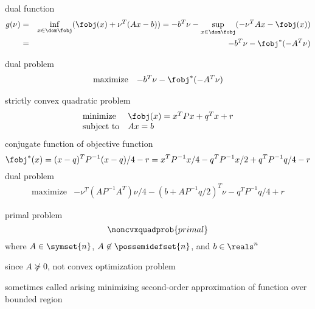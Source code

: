 \documentclass[17pt,landscape]{foils}
\begin{document}
{\vitem
	dual function
	\begin{eqnarray*}
			g(\nu)
			&
			=
			&
			\inf_{x\in\dom \fobj} (\fobj(x) + \nu^T(Ax-b))
			=
			-b^T\nu
			- \sup_{x\in\dom \fobj}(-\nu^TAx -\fobj(x))
		\\
		&
		=
		&
			-b^T\nu - \fobj^\ast(-A^T\nu)
	\end{eqnarray*}

\vitem
	dual problem
	$$
		\begin{array}{ll}
			\mbox{maximize} &
				-b^T\nu - \fobj^\ast(-A^T\nu)
		\end{array}
	$$
\eit
\vfill



\bit
\item
	strictly convex quadratic problem
	$$
		\begin{array}{ll}
			\mbox{minimize} &
				\fobj(x) = x^TPx + q^T x + r
			\\
			\mbox{subject to} &
				Ax=b
		\end{array}
	$$
	\bit
	\vitem
		conjugate function of objective function
		$$
			\fobj^\ast(x)
			= (x-q)^TP^{-1}(x-q)/4 - r
			=
				x^TP^{-1}x/4
				-q^TP^{-1}x/2
				+ q^TP^{-1}q/4
				-r
		$$
	\vitem
		dual problem
		$$
			\begin{array}{ll}
				\mbox{maximize} &
					-\nu^T (AP^{-1}A^T)\nu /4 -(b + A P^{-1} q/2)^T\nu - q^TP^{-1}q/4 +r
			\end{array}
		$$
	\eit


\eit
\vfill



\bit
\item
	primal problem
	$$
		\noncvxquadprob{primal}
	$$
	where $A\in\symset{n}$, $A\not\in\possemidefset{n}$, and $b\in\reals^n$
	\bit
	\item
		since $A\not\succeq 0$, not convex optimization problem
	\item
		sometimes called 
		arising minimizing second-order approximation of function
		over bounded region
	\eit

}
\end{document}
